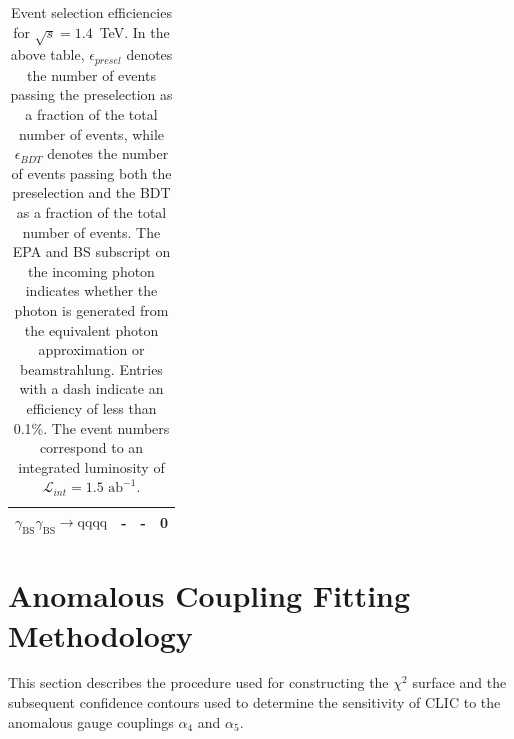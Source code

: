 \begin{table}[h!]
\begin{tabular}{ l r r r }
$\gamma_{\text{BS}}\gamma_{\text{BS}} \rightarrow \text{qqqq}$ & - & - & 0 \\
\hline
\end{tabular}
\caption[Event selection efficiencies for $\sqrt{s}=1.4$~TeV.  In the above table, $\epsilon_{presel}$ denotes the number of events passing the preselection as a fraction of the total number of events, while $\epsilon_{BDT}$ denotes the number of events passing both the preselection and the BDT as a fraction of the total number of events.  The EPA and BS subscript on the incoming photon indicates whether the photon is generated from the equivalent photon approximation or beamstrahlung.  Entries with a dash indicate an efficiency of less than 0.1\%.  The event numbers correspond to an integrated luminosity of $\mathcal{L}_{int} = 1.5\text{ ab}^{-1}$.]{Event selection efficiencies for $\sqrt{s}=1.4$~TeV.  In the above table, $\epsilon_{presel}$ denotes the number of events passing the preselection as a fraction of the total number of events, while $\epsilon_{BDT}$ denotes the number of events passing both the preselection and the BDT as a fraction of the total number of events.  The EPA and BS subscript on the incoming photon indicates whether the photon is generated from the equivalent photon approximation or beamstrahlung.  Entries with a dash indicate an efficiency of less than 0.1\%.  The event numbers correspond to an integrated luminosity of $\mathcal{L}_{int} = 1.5\text{ ab}^{-1}$.}
\label{table:selectionsummary1400GeV}
\end{table}


\section{Anomalous Coupling Fitting Methodology}
\label{sec:fitting}
This section describes the procedure used for constructing the $\chi^{2}$ surface and the subsequent confidence contours used to determine the sensitivity of CLIC to the anomalous gauge couplings $\alpha_{4}$ and $\alpha_{5}$.


